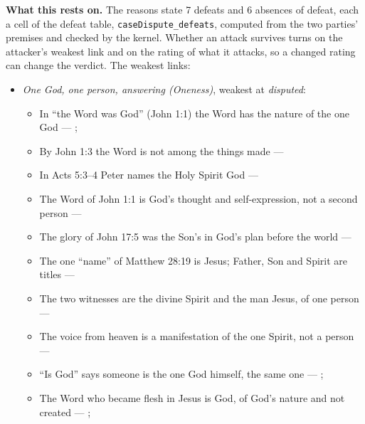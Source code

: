 \documentclass[11pt,paper=\testimonypaper,DIV=13,parskip=false]{scrartcl}
\begin{document}
\par\noindent\textbf{What this rests on.} The reasons state 7 defeats and 6 absences of defeat, each a cell of the defeat table, \texttt{case\allowbreak{}Dispute\_\allowbreak{}defeats}, computed from the two parties' premises and checked by the kernel. Whether an attack survives turns on the attacker's weakest link and on the rating of what it attacks, so a changed rating can change the verdict. The weakest links:
\begin{itemize}
\item \emph{One God, one person, answering (Oneness)}, weakest at \emph{disputed}:
\begin{itemize}
\item In “the Word was God” (John 1:1) the Word has the nature of the one God --- \cite{harner-qualitative-anarthrous-1973}; \cite[3, The Triune God]{kibbey-living-systematic-theology-2026}
\item By John 1:3 the Word is not among the things made --- \cite[Tractates on John I.11]{schaff-nicene-post-nicene-fathers-1-7}
\item In Acts 5:3–4 Peter names the Holy Spirit God --- \cite[198]{calvin-commentary-acts-1844}
\item The Word of John 1:1 is God’s thought and self-expression, not a second person --- \cite[ch. 4 and 8, on John 1:1]{bernard-oneness-of-god-1983}
\item The glory of John 17:5 was the Son’s in God’s plan before the world --- \cite[ch. 8, The Preexistence of Jesus]{bernard-oneness-of-god-1983}
\item The one “name” of Matthew 28:19 is Jesus; Father, Son and Spirit are titles --- \cite[ch. 6, Matthew 28:19]{bernard-oneness-of-god-1983}
\item The two witnesses are the divine Spirit and the man Jesus, of one person --- \cite[ch. 8, Two Witnesses]{bernard-oneness-of-god-1983}
\item The voice from heaven is a manifestation of the one Spirit, not a person --- \cite[ch. 8, The Voice from Heaven]{bernard-oneness-of-god-1983}
\item “Is God” says someone is the one God himself, the same one --- \cite[ch. 8, Are Jesus and the Father One in Purpose Only?]{bernard-oneness-of-god-1983}; \cite[27]{watchtower-should-you-believe-trinity-1989}
\item The Word who became flesh in Jesus is God, of God’s nature and not created --- \cite[3, The Triune God]{kibbey-living-systematic-theology-2026}; \cite[ch. 4, Conclusion]{bernard-oneness-of-god-1983}

\end{itemize}
\end{itemize}
\end{document}
